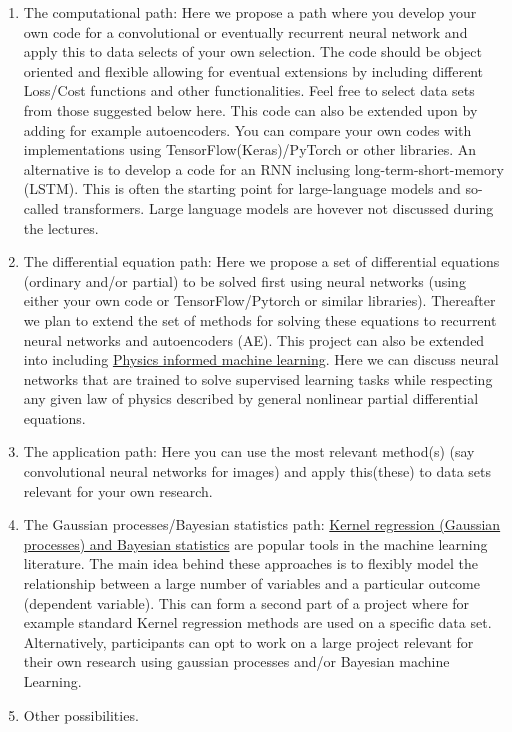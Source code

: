 \documentclass[%
oneside,                 %
final,                   %
10pt]{article}
\begin{document}
\begin{enumerate}
\item The computational path: Here we propose a path where you develop your own code for a convolutional or eventually recurrent neural network and apply this to data selects of your own selection. The code should be object oriented and flexible allowing for eventual extensions by including different Loss/Cost functions and other functionalities. Feel free to select data sets from those suggested below here. This code can also be extended upon by adding for example autoencoders. You can compare your own codes with implementations using TensorFlow(Keras)/PyTorch or other libraries. An alternative is to develop a code for an RNN inclusing long-term-short-memory (LSTM). This is often the starting point for large-language models and so-called transformers. Large language models are hovever not discussed during the lectures.

\item The differential equation path: Here we propose a set of differential equations (ordinary and/or partial) to be solved first using neural networks (using either your own code or TensorFlow/Pytorch or similar libraries). Thereafter we plan to extend the set of methods for solving these equations to recurrent neural networks and autoencoders (AE). This project can also be extended into including \href{{https://github.com/maziarraissi/PINNs}}{Physics informed machine learning}. Here we can discuss neural networks that are trained to solve supervised learning tasks while respecting any given law of physics described by general nonlinear partial differential equations. 

\item The application path: Here you can use the most relevant method(s) (say convolutional neural networks for images) and apply this(these) to data sets relevant for your own research.

\item The Gaussian processes/Bayesian statistics path: \href{{https://jenfb.github.io/bkmr/overview.html}}{Kernel regression (Gaussian processes) and Bayesian statistics} are  popular tools in the machine learning literature. The main idea behind these approaches is to flexibly model the relationship between a large number of variables and a particular outcome (dependent variable). This can form a second part of a project where for example standard Kernel regression methods are used on a specific data set. Alternatively, participants can opt to work on a large project relevant for their own research using gaussian processes and/or Bayesian machine Learning. 

\item Other possibilities.
\end{enumerate}
\end{document}
